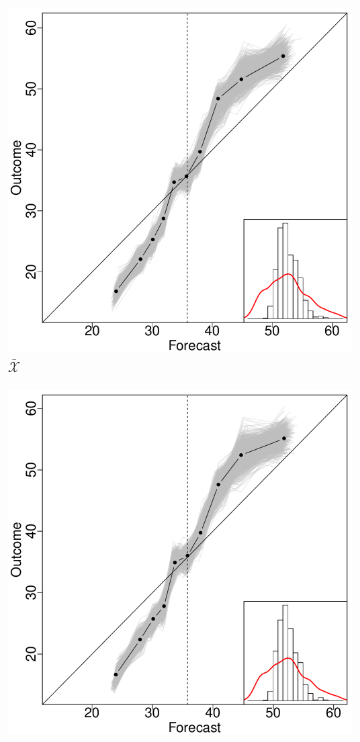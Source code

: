\documentclass[11pt]{article}
\theoremstyle{definition}
\theoremstyle{definition}
\begin{document}
\begin{figure}
        \begin{subfigure}[b]{0.323\textwidth}
                \includegraphics[width=\textwidth]{IndependentELP}
                \caption{$\bar{\mathcal{X}}$}
                \label{fig:mouse}
        \end{subfigure}
                  \begin{subfigure}[b]{0.323\textwidth}
                \includegraphics[width=\textwidth]{IndependentOLP}

\end{subfigure}
\end{figure}
\end{document}
